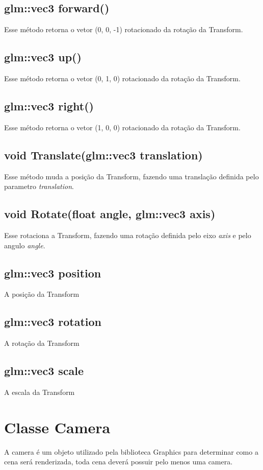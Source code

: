 \subsection{glm::vec3 forward()}
Esse método retorna o vetor (0, 0, -1) rotacionado da rotação da Transform.

\subsection{glm::vec3 up()}
Esse método retorna o vetor (0, 1, 0) rotacionado da rotação da Transform.

\subsection{glm::vec3 right()}
Esse método retorna o vetor (1, 0, 0) rotacionado da rotação da Transform.

\subsection{void Translate(glm::vec3 translation)}
Esse método muda a posição da Transform, fazendo uma translação definida pelo parametro \textit{translation}.

\subsection{void Rotate(float angle, glm::vec3 axis)}
Esse rotaciona a Transform, fazendo uma rotação definida pelo eixo \textit{axis} e pelo angulo \textit{angle}.

\subsection{glm::vec3 position}
A posição da Transform
\subsection{glm::vec3 rotation}
A rotação da Transform
\subsection{glm::vec3 scale}
A escala da Transform

\section{Classe Camera}
\label{doc:camera}

A camera é um objeto utilizado pela biblioteca Graphics para determinar como a cena será renderizada, toda cena deverá possuir pelo menos uma camera.

